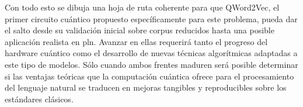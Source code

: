 Con todo esto se dibuja una hoja de ruta coherente para que QWord2Vec, el primer circuito cuántico propuesto específicamente para este problema, pueda dar el salto desde su validación inicial sobre corpus reducidos hasta una posible aplicación realista en \gls{pln}. Avanzar en ellas requerirá tanto el progreso del hardware cuántico como el desarrollo de nuevas técnicas algorítmicas adaptadas a este tipo de modelos. Sólo cuando ambos frentes maduren será posible determinar si las ventajas teóricas que la computación cuántica ofrece para el procesamiento del lenguaje natural se traducen en mejoras tangibles y reproducibles sobre los estándares clásicos.
